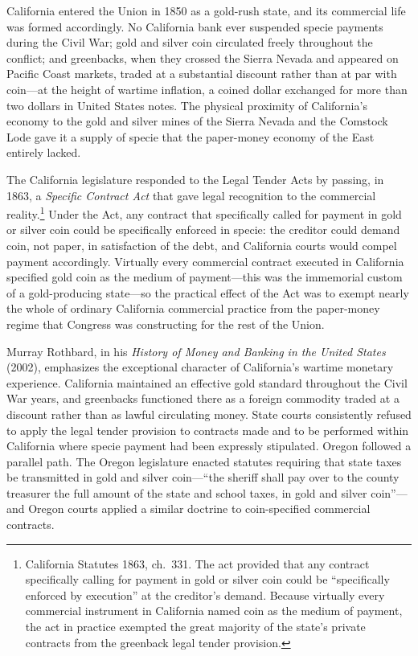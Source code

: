 \documentclass[12pt]{article}
\begin{document}
California entered the Union in 1850 as a gold-rush state, and its
commercial life was formed accordingly. No California bank ever suspended
specie payments during the Civil War; gold and silver coin circulated freely
throughout the conflict; and greenbacks, when they crossed the Sierra Nevada
and appeared on Pacific Coast markets, traded at a substantial discount
rather than at par with coin---at the height of wartime inflation, a coined
dollar exchanged for more than two dollars in United States notes.  The
physical proximity of California's economy to the gold and silver mines of
the Sierra Nevada and the Comstock Lode gave it a supply of specie that the
paper-money economy of the East entirely lacked.

The California legislature responded to the Legal Tender Acts by passing,
in 1863, a \textit{Specific Contract Act} that gave legal recognition to the
commercial reality.\footnote{California Statutes 1863, ch.~331.  The act
provided that any contract specifically calling for payment in gold or silver
coin could be ``specifically enforced by execution'' at the creditor's
demand.  Because virtually every commercial instrument in California named
coin as the medium of payment, the act in practice exempted the great
majority of the state's private contracts from the greenback legal tender
provision.}  Under the Act, any contract that specifically called for payment
in gold or silver coin could be specifically enforced in specie: the creditor
could demand coin, not paper, in satisfaction of the debt, and California
courts would compel payment accordingly.  Virtually every commercial
contract executed in California specified gold coin as the medium of
payment---this was the immemorial custom of a gold-producing state---so the
practical effect of the Act was to exempt nearly the whole of ordinary
California commercial practice from the paper-money regime that Congress was
constructing for the rest of the Union.

Murray Rothbard, in his \textit{History of Money and Banking in the United
States} (2002), emphasizes the exceptional character of California's wartime
monetary experience.  California maintained an effective gold standard
throughout the Civil War years, and greenbacks functioned there as a foreign
commodity traded at a discount rather than as lawful circulating money.
State courts consistently refused to apply the legal tender provision to
contracts made and to be performed within California where specie payment had
been expressly stipulated.  Oregon followed a parallel path.  The Oregon
legislature enacted statutes requiring that state taxes be transmitted in
gold and silver coin---``the sheriff shall pay over to the county treasurer
the full amount of the state and school taxes, in gold and silver
coin''---and Oregon courts applied a similar doctrine to coin-specified
commercial contracts.
\end{document}
